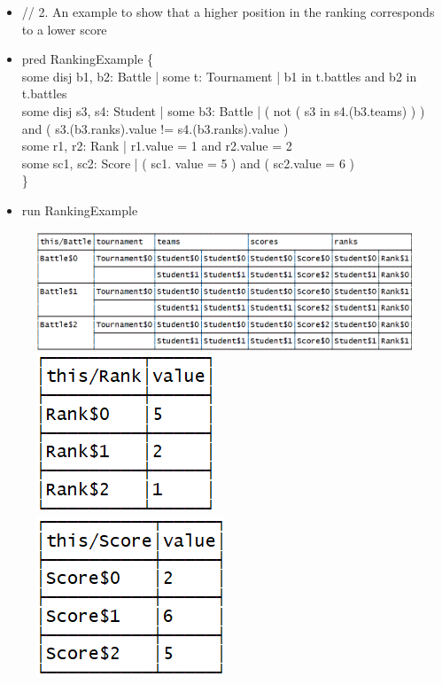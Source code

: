 \documentclass{Configuration_Files/Template}
\begin{document}
\begin{itemize}
\item //  2. An example to show that a higher position in the ranking corresponds to a lower score
\item pred RankingExample \{\\
    some disj b1, b2: Battle | some t: Tournament | b1 in t.battles and b2 in t.battles\\
    some disj s3, s4: Student | some b3: Battle | ( not ( s3 in s4.(b3.teams) ) ) and ( s3.(b3.ranks).value != s4.(b3.ranks).value )\\
    some r1, r2: Rank | r1.value = 1 and r2.value = 2\\
    some sc1, sc2: Score | ( sc1. value = 5 ) and ( sc2.value = 6 )\\
\}
\item run RankingExample
\end{itemize}
\begin{figure}[H]
\includegraphics[scale = 0.7]{Images/Alloy/2Table1.png}\\
\includegraphics[scale = 0.7]{Images/Alloy/2Table2.png}\\
\includegraphics[scale = 0.7]{Images/Alloy/2Table3.png}\\
\centering
\end{figure}
\end{document}
